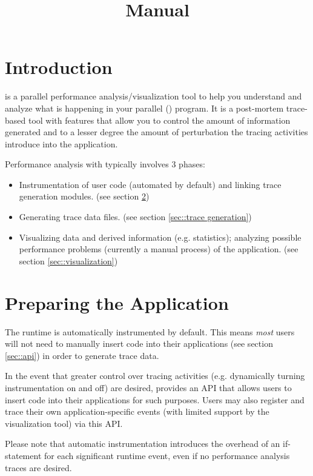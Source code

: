 \documentclass[10pt]{article}
\title{\projections{} Manual}
\begin{document}
\maketitle

\section{Introduction}

\projections{} is a parallel performance analysis/visualization tool
to help you understand and analyze what is happening in your parallel
(\charmpp{}) program. It is a post-mortem trace-based tool with
features that allow you to control the amount of information generated
and to a lesser degree the amount of perturbation the tracing
activities introduce into the application.

Performance analysis with \projections{} typically involves 3 phases:

\begin{itemize}
\item 
Instrumentation of user code (automated by default) and linking trace
generation modules. (see section \ref{sec::preparation})
\item
Generating trace data files. (see section \ref{sec::trace generation})
\item
Visualizing data and derived information (e.g. statistics); analyzing
possible performance problems (currently a manual process) of the
application. (see section \ref{sec::visualization})
\end{itemize}

\section{Preparing the \charmpp{} Application}
\label{sec::preparation}

The \charmpp{} runtime is automatically instrumented by default. This
means {\em most} users will not need to manually insert code into
their applications (see section \ref{sec::api}) in order to generate
trace data.

In the event that greater control over tracing activities
(e.g. dynamically turning instrumentation on and off) are desired,
\projections{} provides an API that allows users to insert code into
their applications for such purposes. Users may also register and
trace their own application-specific events (with limited support by
the visualization tool) via this API.

Please note that automatic instrumentation introduces the overhead of
an if-statement for each significant runtime event, even if no
performance analysis traces are desired.
\end{document}
